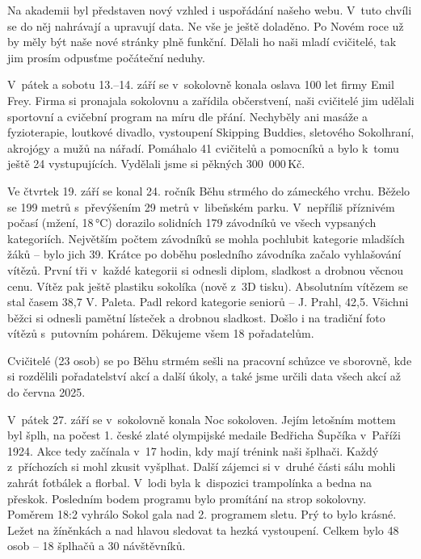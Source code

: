 \documentclass[11pt]{article}
\begin{document}
Na akademii byl představen nový vzhled i uspořádání našeho webu. V~tuto chvíli se do něj nahrávají a upravují data. Ne vše je ještě doladěno. Po Novém roce už by měly být naše nové stránky plně funkční. Dělali ho naši mladí cvičitelé, tak jim prosím odpusťme počáteční neduhy. 



V~pátek a sobotu 13.–14. září se v~sokolovně konala oslava 100 let firmy Emil Frey. Firma si pronajala sokolovnu a zařídila občerstvení, naši cvičitelé jim udělali sportovní a cvičební program na míru dle přání. Nechyběly ani masáže a fyzioterapie, loutkové divadlo, vystoupení Skipping Buddies, sletového Sokolhraní, akrojógy a mužů na nářadí. Pomáhalo 41 cvičitelů a pomocníků a bylo k~tomu ještě 24 vystupujících. Vydělali jsme si pěkných 300~000\,Kč.

Ve čtvrtek 19. září se konal 24. ročník Běhu strmého do zámeckého vrchu. Běželo se 199 metrů s~převýšením 29 metrů v~libeňském parku. V~nepříliš příznivém počasí (mžení, 18\,°C) dorazilo solidních 179 závodníků ve všech vypsaných kategoriích. Největším počtem závodníků se mohla pochlubit kategorie mladších žáků – bylo jich 39. Krátce po doběhu posledního závodníka začalo vyhlašování vítězů. První tři v~každé kategorii si odnesli diplom, sladkost a drobnou věcnou cenu. Vítěz pak ještě plastiku sokolíka (nově z~3D tisku). Absolutním vítězem se stal časem 38,7 V. Paleta. Padl rekord kategorie seniorů – J. Prahl, 42,5. Všichni běžci si odnesli pamětní lísteček a drobnou sladkost. Došlo i na tradiční foto vítězů s~putovním pohárem. Děkujeme všem 18 pořadatelům.

Cvičitelé (23 osob) se po Běhu strmém sešli na pracovní schůzce ve sborovně, kde si rozdělili pořadatelství akcí a další úkoly, a také jsme určili data všech akcí až do června 2025.

\clearpage
{}
V~pátek 27. září se v~sokolovně konala Noc sokoloven. Jejím letošním mottem byl šplh, na počest 1. české zlaté olympijské medaile Bedřicha Šupčíka v~Paříži 1924. Akce tedy začínala v~17 hodin, kdy mají trénink naši šplhači. Každý z~příchozích si mohl zkusit vyšplhat. Další zájemci si v~druhé části sálu mohli zahrát fotbálek a florbal. V~lodi byla k~dispozici trampolínka a bedna na přeskok. Posledním bodem programu bylo promítání na strop sokolovny. Poměrem 18:2 vyhrálo Sokol gala nad 2. programem sletu. Prý to bylo krásné. Ležet na žíněnkách a nad hlavou sledovat ta hezká vystoupení. Celkem bylo 48 osob – 18 šplhačů a 30 návštěvníků.
\end{document}
